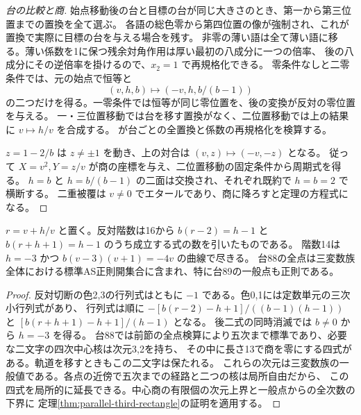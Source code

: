 \begin{proof}[台の比較と商]
始点移動後の台と目標の台が同じ大きさのとき、第一から第三位置までの置換を全て選ぶ。
各語の総色零から第四位置の像が強制され、これが置換で実際に目標の台を与える場合を残す。
非零の薄い語は全て薄い語に移る。薄い係数を1に保つ残余対角作用は厚い最初の八成分に一つの倍率、
後の八成分にその逆倍率を掛けるので、$x_2=1$ で再規格化できる。
零条件なしと二零条件では、元の始点で恒等と
\[
 (v,h,b)\longmapsto(-v,h,b/(b-1))
\]
の二つだけを得る。一零条件では恒等が同じ零位置を、後の変換が反対の零位置を与える。
一・三位置移動では台を移す置換がなく、二位置移動では上の結果に $v\mapsto h/v$ を合成する。
 が台ごとの全置換と係数の再規格化を検算する。

$z=1-2/b$ は $z\ne\pm1$ を動き、上の対合は $(v,z)\mapsto(-v,-z)$ となる。
従って $X=v^2,Y=z/v$ が商の座標を与え、二位置移動の固定条件から周期式を得る。
$h=b$ と $h=b/(b-1)$ の二面は交換され、それぞれ既約で $h=b=2$ で横断する。
二重被覆は $v\ne0$ でエタールであり、商に降ろすと定理の方程式になる。
\end{proof}

\begin{corollary}
$r=v+h/v$ と置く。反対階数は16から
$b(r-2)=h-1$ と $b(r+h+1)=h-1$ のうち成立する式の数を引いたものである。
階数14は $h=-3$ かつ $b(v-3)(v+1)=-4v$ の曲線で尽きる。
台88の全点は三変数族全体における標準AS正則開集合に含まれ、特に台89の一般点も正則である。
\end{corollary}
\begin{proof}
反対切断の色2,3の行列式はともに $-1$ である。色0,1には定数単元の三次小行列式があり、
行列式は順に $-[b(r-2)-h+1]/((b-1)(h-1))$ と $[b(r+h+1)-h+1]/(h-1)$ となる。
後二式の同時消滅では $b\ne0$ から $h=-3$ を得る。
台88では前節の全点検算により五次まで標準であり、必要な二文字の四次中心核は次元3,2を持ち、
その中に長さ13で商を零にする四式がある。軌道を移すときもこの二文字は保たれる。
これらの次元は三変数族の一般値である。各点の近傍で五次までの経路と二つの核は局所自由だから、
この四式を局所的に延長できる。中心商の有限個の次元上界と一般点からの全次数の下界に
定理\ref{thm:parallel-third-rectangle}の証明を適用する。
\end{proof}
